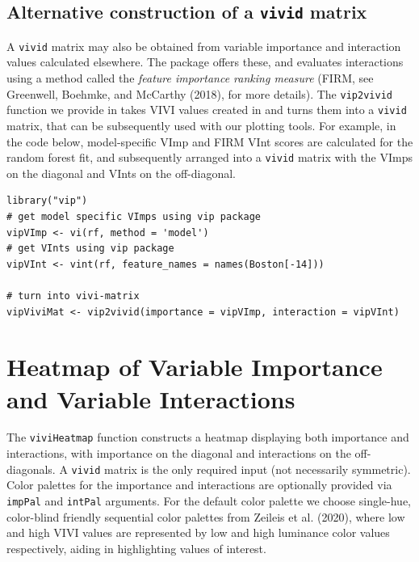 \hypertarget{sec:vip2vivid}{%
\subsection{\texorpdfstring{Alternative construction of a \texttt{vivid} matrix}{Alternative construction of a vivid matrix}}\label{sec:vip2vivid}}

A \texttt{vivid} matrix may also be obtained from variable importance and interaction values calculated elsewhere. The package  offers these, and evaluates interactions using a method called the \emph{feature importance ranking measure} (FIRM, see Greenwell, Boehmke, and McCarthy (2018), for more details). The \texttt{vip2vivid} function we provide in  takes VIVI values created in  and turns them into a \texttt{vivid} matrix, that can be subsequently used with our plotting tools. For example, in the code below, model-specific VImp and FIRM VInt scores are calculated for the random forest fit, and subsequently arranged into a \texttt{vivid} matrix with the VImps on the diagonal and VInts on the off-diagonal.

\begin{verbatim}
library("vip")
# get model specific VImps using vip package
vipVImp <- vi(rf, method = 'model')
# get VInts using vip package
vipVInt <- vint(rf, feature_names = names(Boston[-14]))

# turn into vivi-matrix
vipViviMat <- vip2vivid(importance = vipVImp, interaction = vipVInt)
\end{verbatim}

\hypertarget{sec:heatmapSec}{%
\section{Heatmap of Variable Importance and Variable Interactions}\label{sec:heatmapSec}}

The \texttt{viviHeatmap} function constructs a heatmap displaying both importance and interactions, with importance on the diagonal and interactions on the off-diagonals. A \texttt{vivid} matrix is the only required input (not necessarily symmetric). Color palettes for the importance and interactions are optionally provided via \texttt{impPal} and \texttt{intPal} arguments.
For the default color palette we choose single-hue, color-blind friendly sequential color palettes from Zeileis et al. (2020), where low and high VIVI values are represented by low and high luminance color values respectively, aiding in highlighting values of interest.

